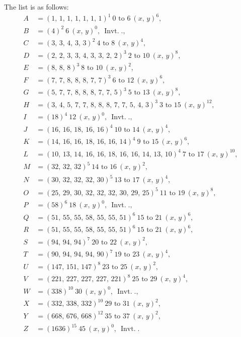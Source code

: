 \documentclass[11pt,a4paper]{article}
\theoremstyle{cayley}
\DeclareMathOperator{\Invt}{Invt.}
\begin{document}
The list is as follows:
\begin{align*}
A &= (1,\, 1,\, 1,\, 1,\, 1,\, 1,\, 1)^{1}\ 0\text{ to }6\ (x,\, y)^{6},\\
B &= (4)^{2}\ 6\ (x,\, y)^{0},\ \Invt.,\\
C &= (3,\, 3,\, 4,\, 3,\, 3)^{2}\ 4\text{ to }8\ (x,\, y)^{4},\\
D &= (2,\, 2,\, 3,\, 3,\, 4,\, 3,\, 3,\, 2,\, 2)^{3}\ 2\text{ to }10\ (x,\, y)^{8},\\
E &= (8,\, 8,\, 8)^{3}\ 8\text{ to }10\ (x,\, y)^{2},\\
F &= (7,\, 7,\, 8,\, 8,\, 8,\, 7,\, 7)^{3}\ 6\text{ to }12\ (x,\, y)^{6},\\
G &= (5,\, 7,\, 7,\, 8,\, 8,\, 8,\, 7,\, 7,\, 5)^{3}\ 5\text{ to }13\ (x,\, y)^{8},\\
H &= (3,\, 4,\, 5,\, 7,\, 7,\, 8,\, 8,\, 8,\, 7,\, 7,\, 5,\, 4,\, 3)^{3}\ 3\text{ to }15\ (x,\, y)^{12},\\
I &= (18)^{4}\ 12\ (x,\, y)^{0},\ \Invt.,\\
J &= (16,\, 16,\, 18,\, 16,\, 16)^{4}\ 10\text{ to }14\ (x,\, y)^{4},\\
K &= (14,\, 16,\, 16,\, 18,\, 16,\, 16,\, 14)^{4}\ 9\text{ to }15\ (x,\, y)^{6},\\
L &= (10,\, 13,\, 14,\, 16,\, 16,\, 18,\, 16,\, 16,\, 14,\, 13,\, 10)^{4}\ 7\text{ to }17\ (x,\, y)^{10},\\
M &= (32,\, 32,\, 32)^{5}\ 14\text{ to }16\ (x,\, y)^{2},\\
N &= (30,\, 32,\, 32,\, 32,\, 30)^{5}\ 13\text{ to }17\ (x,\, y)^{4},\\
O &= (25,\, 29,\, 30,\, 32,\, 32,\, 32,\, 30,\, 29,\, 25)^{5}\ 11\text{ to }19\ (x,\, y)^{8},\\
P &= (58)^{6}\ 18\ (x,\, y)^{0},\ \Invt.,\\
Q &= (51,\, 55,\, 55,\, 58,\, 55,\, 55,\, 51)^{6}\ 15\text{ to }21\ (x,\, y)^{6},\\
R &= (51,\, 55,\, 55,\, 58,\, 55,\, 55,\, 51)^{6}\ 15\text{ to }21\ (x,\, y)^{6},\\
S &= (94,\, 94,\, 94)^{7}\ 20\text{ to }22\ (x,\, y)^{2},\\
T &= (90,\, 94,\, 94,\, 94,\, 90)^{7}\ 19\text{ to }23\ (x,\, y)^{4},\\
U &= (147,\, 151,\, 147)^{8}\ 23\text{ to }25\ (x,\, y)^{2},\\
V &= (221,\, 227,\, 227,\, 227,\, 221)^{8}\ 25\text{ to }29\ (x,\, y)^{4},\\
W &= (338)^{10}\ 30\ (x,\, y)^{0},\ \Invt.,\\
X &= (332,\, 338,\, 332)^{10}\ 29\text{ to }31\ (x,\, y)^{2},\\
Y &= (668,\, 676,\, 668)^{12}\ 35\text{ to }37\ (x,\, y)^{2},\\
Z &= (1636)^{15}\ 45\ (x,\, y)^{0},\ \Invt.
\end{align*}
\end{document}
